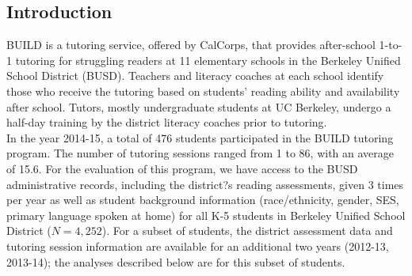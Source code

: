 \documentclass[a0,landscape]{a0poster}
\begin{document}
\vspace{1cm} %


\begin{multicols}{3} %



\color{SaddleBrown} %

\section*{Introduction}

BUILD is a tutoring service, offered by CalCorps, that provides after-school 1-to-1 tutoring for struggling readers at 11 elementary schools in the Berkeley Unified School District (BUSD). Teachers and literacy coaches at each school identify those who receive the tutoring based on students' reading ability and availability after school. Tutors, mostly undergraduate students at UC Berkeley, undergo a half-day training by the district literacy coaches prior to tutoring. \\

In the year 2014-15, a total of 476 students participated in the BUILD tutoring program. The number of tutoring sessions ranged from 1 to 86, with an average of 15.6. For the evaluation of this program, we have access to the BUSD administrative records, including the district?s reading assessments, given 3 times per year as well as student background information (race/ethnicity, gender, SES, primary language spoken at home) for all K-5 students in Berkeley Unified School District ($N = 4,252$). For a subset of students, the district assessment data and tutoring session information are available for an additional two years (2012-13, 2013-14); the analyses described below are for this subset of students. 



\end{multicols}
\end{document}
